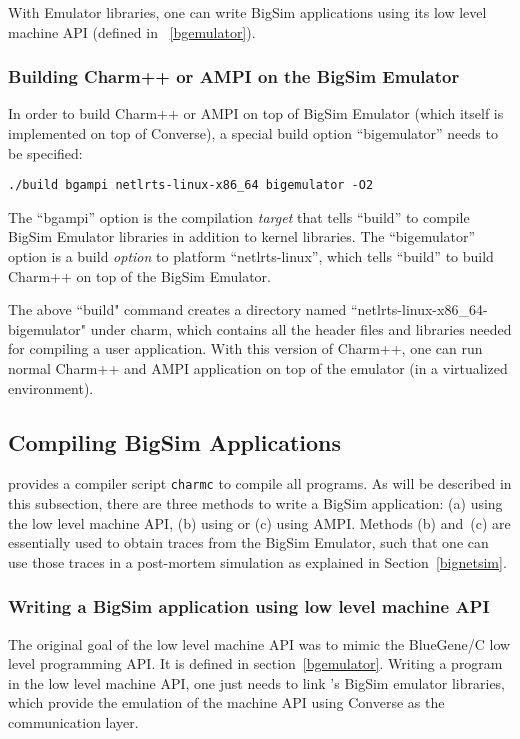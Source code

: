 With Emulator libraries, one can write BigSim applications using its
low level machine API (defined in ~\ref{bgemulator}).

\subsubsection{Building Charm++ or AMPI on the BigSim Emulator}

In order to build Charm++ or AMPI on top of BigSim Emulator (which itself is
implemented on top of Converse), a special build option ``bigemulator'' needs
to be specified:
\begin{verbatim}
./build bgampi netlrts-linux-x86_64 bigemulator -O2
\end{verbatim}

The ``bgampi'' option is the compilation {\em target} that tells ``build'' to
compile BigSim Emulator libraries in addition to \charmpp{} kernel libraries.
The ``bigemulator'' option is a build {\em option} to platform ``netlrts-linux'',
which tells ``build'' to build Charm++ on top of the BigSim Emulator. 

The above ``build" command creates a directory named
``netlrts-linux-x86\_64-bigemulator" under charm, which contains all the header
files and libraries needed for compiling a user application.
With this version of Charm++, one can run normal Charm++ and AMPI application
on top of the emulator (in a virtualized environment).

\subsection{Compiling BigSim Applications}

\charmpp{} provides a compiler script {\tt charmc} to compile all programs.  As
will be described in this subsection, there are three methods to write a BigSim
application: (a) using the low level machine API, (b) using \charmpp{} or (c)
using AMPI. Methods (b) and~(c) are essentially used to obtain traces from the
BigSim Emulator, such that one can use those traces in a post-mortem simulation
as explained in Section~\ref{bignetsim}.

\subsubsection{Writing a BigSim application using low level machine API}
The original goal of the low level machine API was to mimic the BlueGene/C low
level programming API. It is defined in section~\ref{bgemulator}. Writing a
program in the low level machine API, one just needs to link \charmpp{}'s
BigSim emulator libraries, which provide the emulation of the machine API using
Converse as the communication layer.

